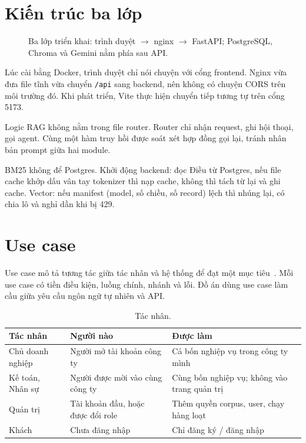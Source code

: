 \section{Kiến trúc ba lớp}

\begin{figure}[htp]
\centering
\hinhKienTruc
\caption{Ba lớp triển khai: trình duyệt $\rightarrow$ nginx $\rightarrow$ FastAPI;
PostgreSQL, Chroma và Gemini nằm phía sau API.}
\label{fig:kien-truc-he-thong}
\end{figure}

Lúc cài bằng Docker, trình duyệt chỉ nói chuyện với cổng frontend. Nginx vừa
đưa file tĩnh vừa chuyển \texttt{/api} sang backend, nên không có chuyện CORS
trên môi trường đó. Khi phát triển, Vite thực hiện chuyển tiếp tương tự trên
cổng 5173.

Logic RAG không nằm trong file router. Router chỉ nhận request, ghi hội thoại,
gọi agent. Cùng một hàm truy hồi được soát xét hợp đồng gọi lại, tránh nhân bản
prompt giữa hai module.

BM25 không để Postgres. Khởi động backend: đọc Điều từ Postgres, nếu file cache
khớp dấu vân tay tokenizer thì nạp cache, không thì tách từ lại và ghi cache.
Vector: nếu manifest (model, số chiều, số record) lệch thì nhúng lại, có chia
lô và nghỉ dần khi bị 429.

\section{Use case}

Use case mô tả tương tác giữa tác nhân và hệ thống để đạt một mục tiêu~\cite{thanh2024}.
Mỗi use case có tiền điều kiện, luồng chính, nhánh và lỗi. Đồ án dùng use case
làm cầu giữa yêu cầu ngôn ngữ tự nhiên và API.

\begin{table}[htp]
\centering
\caption{Tác nhân.}
\label{tab:vai-tro}
\begin{tabular}{p{3.0cm}p{5.4cm}p{5.4cm}}
\toprule
\textbf{Tác nhân} & \textbf{Người nào} & \textbf{Được làm} \\
\midrule
Chủ doanh nghiệp & Người mở tài khoản công ty & Cả bốn nghiệp vụ trong công ty
mình \\
Kế toán, Nhân sự & Người được mời vào cùng công ty & Cùng bốn nghiệp vụ; không
vào trang quản trị \\
Quản trị & Tài khoản đầu, hoặc được đổi role & Thêm quyền corpus, user, chạy
hàng loạt \\
Khách & Chưa đăng nhập & Chỉ đăng ký / đăng nhập \\
\bottomrule
\end{tabular}
\end{table}

